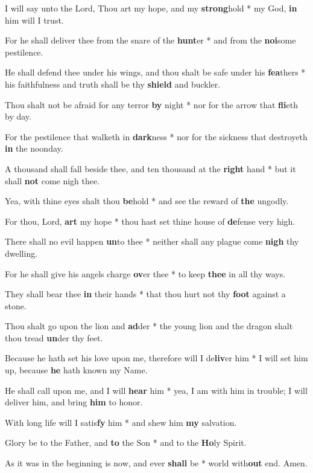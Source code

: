 \begin{multicols}{2}
	I will say unto the Lord, Thou art my hope, and my \textbf{strong}hold * my God, \textbf{in} him will I trust.
	
	For he shall deliver thee from the snare of the \textbf{hunt}er * and from the \textbf{noi}some pestilence.
	
	He shall defend thee under his wings, and thou shalt be safe under his \textbf{fea}thers * his faithfulness and truth shall be thy \textbf{shield} and buckler.
	
	Thou shalt not be afraid for any terror \textbf{by} night * nor for the arrow that \textbf{fli}eth by day.
	
	For the pestilence that walketh in \textbf{dark}ness * nor for the sickness that destroyeth \textbf{in} the noonday.
	
	A thousand shall fall beside thee, and ten thousand at the \textbf{right} hand * but it shall \textbf{not} come nigh thee.
	
	Yea, with thine eyes shalt thou \textbf{be}hold * and see the reward of \textbf{the} ungodly.
	
	For thou, Lord, \textbf{art} my hope * thou hast set thine house of \textbf{de}fense very high.
	
	There shall no evil happen \textbf{un}to thee * neither shall any plague come \textbf{nigh} thy dwelling.
	
	For he shall give his angels charge \textbf{ov}er thee * to keep \textbf{thee} in all thy ways.
	
	They shall bear thee \textbf{in} their hands * that thou hurt not thy \textbf{foot} against a stone.
	
	Thou shalt go upon the lion and \textbf{ad}der * the young lion and the dragon shalt thou tread \textbf{un}der thy feet.
	
	Because he hath set his love upon me, therefore will I de\textbf{liv}er him * I will set him up, because \textbf{he} hath known my Name.
	
	He shall call upon me, and I will \textbf{hear} him * yea, I am with him in trouble; I will deliver him, and bring \textbf{him} to honor.
	
	With long life will I satis\textbf{fy} him * and shew him \textbf{my} salvation.
	
	Glory be to the Father, and \textbf{to} the Son * and to the \textbf{Ho}ly Spirit.
	
	As it was in the beginning is now, and ever \textbf{shall} be * world with\textbf{out} end. Amen.
\end{multicols}